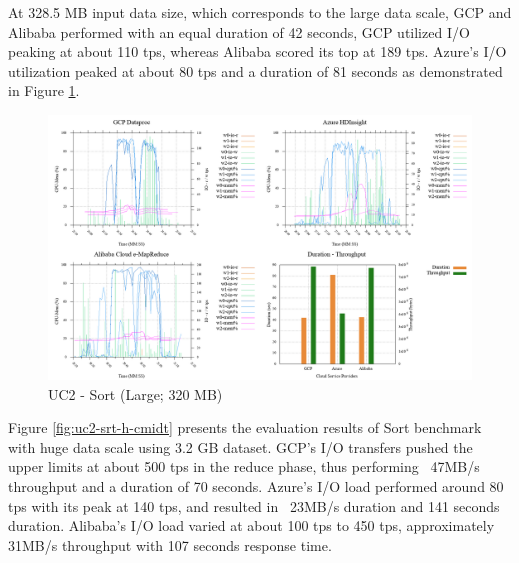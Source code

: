 \documentclass[review]{elsarticle}
\begin{document}
At 328.5 MB input data size, which corresponds to the large data scale, GCP and Alibaba performed with an equal duration of 42 seconds, GCP utilized I/O peaking at about 110 tps, whereas Alibaba scored its top at 189 tps. Azure's I/O utilization peaked at about 80 tps and a duration of 81 seconds as demonstrated in Figure \ref{fig:uc2-srt-l-cmidt}. 

\begin{figure}[p]
	\caption{UC2 - Sort (Large; 320 MB)}
	\label{fig:uc2-srt-l-cmidt}
	\includegraphics[width=\textwidth]{uc2-srt-l-cmidt}
	\centering
\end{figure}


Figure \ref{fig:uc2-srt-h-cmidt} presents the evaluation results of Sort benchmark with huge data scale using 3.2 GB dataset.  GCP's I/O transfers pushed the upper limits at about 500 tps in the reduce phase, thus performing ~47MB/s throughput and a duration of 70 seconds. Azure's I/O load performed around 80 tps with its peak at 140 tps, and resulted in ~23MB/s duration and 141 seconds duration. Alibaba's I/O load varied at about 100 tps to 450 tps, approximately 31MB/s throughput with 107 seconds response time. 
\end{document}
